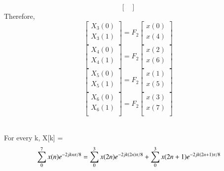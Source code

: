 \documentclass[journal,12pt,twocolumn]{IEEEtran}
\renewcommand\thesection{\arabic{section}}
\begin{document}
\begin{enumerate}[label=\arabic*.,ref=\thesection.\theenumi]
\begin{equation}
\begin{bmatrix}
\end{bmatrix}
\end{equation}
Therefore,
\begin{equation}
\begin{bmatrix}
X_{3}(0) \\ 
X_{3}(1)\\ 
\end{bmatrix}
= F_{2}
\begin{bmatrix}
x(0) \\ 
x(4) \\ 
\end{bmatrix}
\end{equation}
\begin{equation}
\begin{bmatrix}
X_{4}(0) \\ 
X_{4}(1)\\ 
\end{bmatrix}
= F_{2}
\begin{bmatrix}
x(2) \\ 
x(6) \\ 
\end{bmatrix}
\end{equation}
\begin{equation}
\begin{bmatrix}
X_{5}(0) \\ 
X_{5}(1)\\ 
\end{bmatrix}
= F_{2}
\begin{bmatrix}
x(1) \\ 
x(5) \\ 
\end{bmatrix}
\end{equation}
\begin{equation}
\begin{bmatrix}
X_{6}(0) \\ 
X_{6}(1)\\ 
\end{bmatrix}
= F_{2}
\begin{bmatrix}
x(3) \\ 
x(7) \\ 
\end{bmatrix}
\end{equation}
\begin{solution}
\\
For every k, X[k] = 
\begin{equation}
	\\
	\sum_{0}^{7}x(n)e^{-2jkn\pi/8}
	\\
	= \sum_{0}^{3}x(2n)e^{-2jk(2n)\pi/8}+\sum_{0}^{3}x(2n+1)e^{-2jk(2n+1)\pi/8}

\end{equation}
\end{solution}
\end{enumerate}
\end{document}

